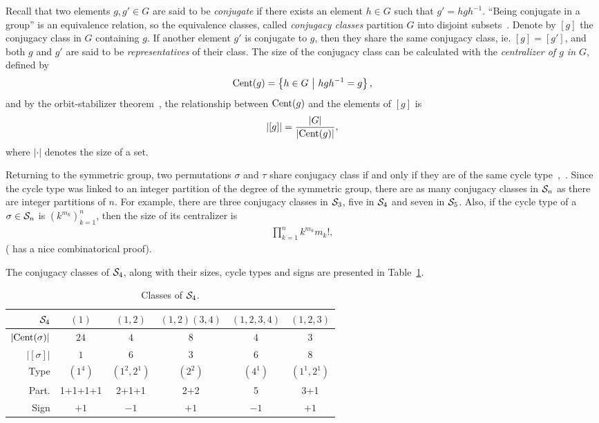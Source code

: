 Recall that two elements $g, g' \in G$ are said to be \textit{conjugate} if there exists an element $h \in G$ such that $g' = hgh^{-1}$. ``Being conjugate in a group'' is an equivalence relation, so the equivalence classes, called \textit{conjugacy classes} partition $G$ into disjoint subsets~\cite[Sect.1.1.]{Sagan}. Denote by $[g]$ the conjugacy class in $G$ containing $g$. If another element $g'$ is conjugate to $g$, then they share the same conjugacy class, ie. $[g] = [g']$, and both $g$ and $g'$ are said to be \textit{representatives} of their class. The size of the conjugacy class can be calculated with the \textit{centralizer of $g$ in $G$}, defined by
\begin{align*}
	\text{Cent}(g) = \left\lbrace h \in G \ \middle\vert \ hgh^{-1} = g \right\rbrace,
\end{align*}
and by the orbit-stabilizer theorem~\cite[Thm.21.3]{Biggs}, the relationship between $\text{Cent}(g)$ and the elements of $[g]$ is 
\begin{align*}
	|[g]| = \frac{|G|}{|\text{Cent}(g)|},
\end{align*}
where $| \cdot |$ denotes the size of a set.

Returning to the symmetric group, two permutations $\sigma$ and $\tau$ share conjugacy class if and only if they are of the same cycle type~\cite[Sect.1.1.]{Sagan},~\cite[Thm.12.5.]{Biggs}. Since the cycle type was linked to an integer partition of the degree of the symmetric group, there are as many conjugacy classes in $\mathcal{S}_n$ as there are integer partitions of $n$. For example, there are three conjugacy classes in $\mathcal{S}_3$, five in $\Sym_4$ and seven in $\mathcal{S}_5$. Also, if the cycle type of a $\sigma \in \mathcal{S}_n$ is $(k^{m_k})_{k=1}^n$, then the size of its centralizer is 
\begin{align*}
	\prod_{k=1}^{n} k^{m_k} m_k!,
\end{align*}
(\cite[Prop.1.1.1.]{Sagan} has a nice combinatorical proof).

\begin{example}[$\Sym_4$]
	The conjugacy classes of $\Sym_4$, along with their sizes, cycle types and signs are presented in Table~\ref{table:elementsSym4}.
	\begin{table}[hbt!]
		\centering
		\begin{tabular}{r | c c c c c}
			         $\Sym_4$ & $(1)$   & $(1,2)$     & $(1,2)(3,4)$ & $(1,2,3,4)$ & $(1,2,3)$   \\ \hline
			$|\text{Cent}(\sigma)|$ & $24$    & $4$         & $8$          & $4$         & $3$         \\
			     $|[\sigma]|$ & $1$     & $6$         & $3$          & $6$         & $8$         \\
			             Type & $(1^4)$ & $(1^2,2^1)$ & $(2^2)$      & $(4^1)$     & $(1^1,2^1)$ \\
			            Part. & 1+1+1+1 & 2+1+1       & 2+2          & 5           & 3+1         \\
			             Sign & $+1$    & $-1$        & $+1$         & $-1$& $+1$        
		\end{tabular}
		\caption{Classes of $\Sym_4$.}
		\label{table:elementsSym4}
	\end{table}
\end{example}


